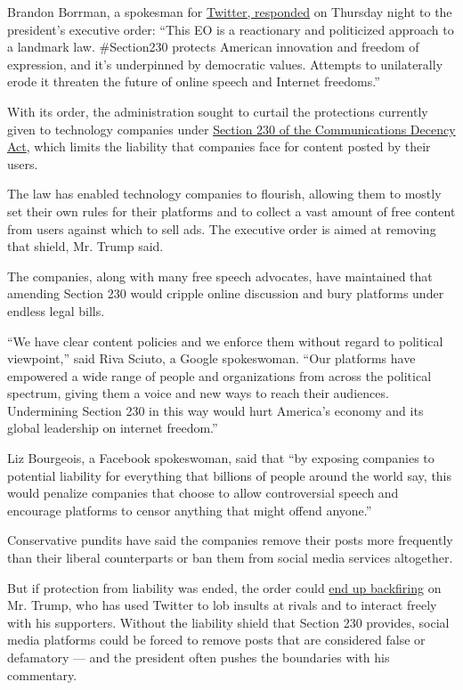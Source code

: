 Brandon Borrman, a spokesman for
\href{https://twitter.com/Policy/status/1266170586197262337?s=20}{Twitter,
responded} on Thursday night to the president's executive order: ``This
EO is a reactionary and politicized approach to a landmark law.
\#Section230 protects American innovation and freedom of expression, and
it's underpinned by democratic values. Attempts to unilaterally erode it
threaten the future of online speech and Internet freedoms.''

With its order, the administration sought to curtail the protections
currently given to technology companies under
\href{https://www.nytimes.com/2020/05/28/business/section-230-internet-speech.html}{Section
230 of the Communications Decency Act}, which limits the liability that
companies face for content posted by their users.

The law has enabled technology companies to flourish, allowing them to
mostly set their own rules for their platforms and to collect a vast
amount of free content from users against which to sell ads. The
executive order is aimed at removing that shield, Mr. Trump said.

The companies, along with many free speech advocates, have maintained
that amending Section 230 would cripple online discussion and bury
platforms under endless legal bills.

``We have clear content policies and we enforce them without regard to
political viewpoint,'' said Riva Sciuto, a Google spokeswoman. ``Our
platforms have empowered a wide range of people and organizations from
across the political spectrum, giving them a voice and new ways to reach
their audiences. Undermining Section 230 in this way would hurt
America's economy and its global leadership on internet freedom.''

Liz Bourgeois, a Facebook spokeswoman, said that ``by exposing companies
to potential liability for everything that billions of people around the
world say, this would penalize companies that choose to allow
controversial speech and encourage platforms to censor anything that
might offend anyone.''

Conservative pundits have said the companies remove their posts more
frequently than their liberal counterparts or ban them from social media
services altogether.

But if protection from liability was ended, the order could
\href{https://www.nytimes.com/2020/05/28/us/politics/trump-social-media-executive-order.html}{end
up backfiring} on Mr. Trump, who has used Twitter to lob insults at
rivals and to interact freely with his supporters. Without the liability
shield that Section 230 provides, social media platforms could be forced
to remove posts that are considered false or defamatory --- and the
president often pushes the boundaries with his commentary.

